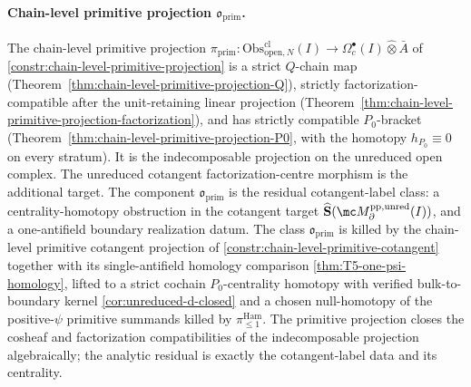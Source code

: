 \documentclass[11pt]{memoir}
\begin{document}
\paragraph{\texorpdfstring{Chain-level primitive projection \(\mathfrak o_{\mathrm{prim}}\).}{Chain-level primitive projection o-prim.}}
The chain-level primitive projection
\(\pi_{\mathrm{prim}}\colon
\mathrm{Obs}^{\mathrm{cl}}_{\mathrm{open},N}(I)\to
\Omega^\bullet_c(I)\widehat\otimes\bar A\) of
\ref{constr:chain-level-primitive-projection} is a strict
\(Q\)-chain map (Theorem~\ref{thm:chain-level-primitive-projection-Q}),
strictly factorization-compatible after the unit-retaining linear
projection
(Theorem~\ref{thm:chain-level-primitive-projection-factorization}),
and has strictly compatible \(P_0\)-bracket
(Theorem~\ref{thm:chain-level-primitive-projection-P0}, with the
homotopy \(h_{P_0}\equiv0\) on every stratum).  It is the
indecomposable projection on the unreduced open complex.  The
unreduced cotangent factorization-centre morphism is the additional
target.  The component
\(\mathfrak o_{\mathrm{prim}}\) is the residual cotangent-label
class: a centrality-homotopy obstruction in the cotangent target
\(\widehat{\mathbf S}(\mc M^{\mathrm{pp,unred}}_\partial(I))\), and a
  one-antifield boundary realization datum.  The class
\(\mathfrak o_{\mathrm{prim}}\) is killed by the chain-level
primitive cotangent projection of
\ref{constr:chain-level-primitive-cotangent} together with its
single-antifield homology comparison
\ref{thm:T5-one-psi-homology}, lifted to a strict cochain
\(P_0\)-centrality homotopy with verified bulk-to-boundary kernel
\ref{cor:unreduced-d-closed} and a chosen null-homotopy of the
positive-\(\psi\) primitive summands killed by
\(\pi_{\leq1}^{\mathrm{Ham}}\).  The primitive projection closes the
cosheaf and factorization compatibilities of the indecomposable
projection algebraically; the analytic residual is exactly the
cotangent-label data and its centrality.


\end{document}
